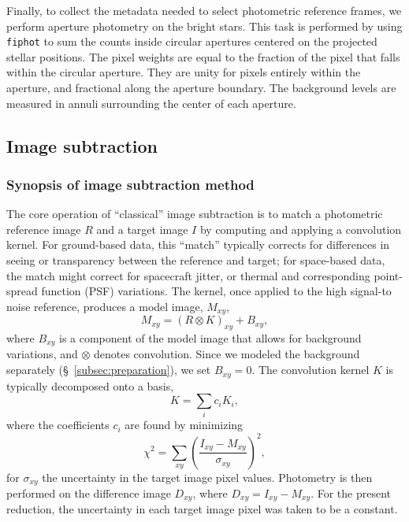 \documentclass[12pt,twocolumn,tighten,trackchanges]{aastex62}
\begin{document}
Finally, to collect the metadata needed to select photometric
reference frames, we perform aperture photometry on the bright stars.
This task is performed by using \texttt{fiphot} to sum the counts
inside circular apertures centered on the projected stellar positions.
The pixel weights are equal to the fraction of the pixel that falls
within the circular aperture.  They are unity for pixels entirely
within the aperture, and fractional along the aperture boundary.  The
background levels are measured in annuli surrounding the center of
each aperture. 


\subsection{Image subtraction}
\label{subsec:imagesubtraction}

\subsubsection{Synopsis of image subtraction method}

The core operation of ``classical'' image subtraction is to match a
photometric reference image $R$ and a target image $I$ by computing
and applying a convolution kernel.  For ground-based data, this
``match'' typically corrects for differences in seeing or transparency
between the reference and target; for space-based data, the match
might correct for spacecraft jitter, or thermal and corresponding
point-spread function (PSF) variations.  The kernel, once applied to
the high signal-to noise reference, produces a model image, $M_{xy}$,
\begin{equation}
    M_{xy} = (R \otimes K)_{xy} + B_{xy},
    \label{eq:imagemodel}
\end{equation}
where $B_{xy}$ is a component of the model image that allows for
background variations, and $\otimes$ denotes convolution.  Since we
modeled the background separately (\S~\ref{subsec:preparation}), we
set $B_{xy}=0$.  The convolution kernel $K$ is typically decomposed
onto a basis,
\begin{equation}
K = \sum_i c_i K_i,
\end{equation}
where the coefficients $c_i$ are found by minimizing
\begin{equation}
    \chi^2 = \sum_{xy} \left( \frac{I_{xy} - M_{xy}}{\sigma_{xy}} \right)^2,
    \label{eq:chisq_conv}
\end{equation}
for $\sigma_{xy}$ the uncertainty in the target image pixel
values.  Photometry is then performed on the difference image
$D_{xy}$, where $D_{xy} = I_{xy} - M_{xy}$.  For the present
reduction, the uncertainty in each target image pixel was taken to be
a constant.	
\end{document}
